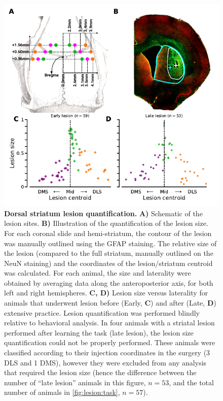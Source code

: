 \begin{figure}[bth!]
	\begin{center}
		\includegraphics[scale=1]{ch-methods/figures/LesionSizeLocation.pdf}
		\caption[Lesion Quantification]
		{\textbf{Dorsal striatum lesion quantification.}
		\textbf{A)} Schematic of the lesion sites.
		\textbf{B)} Illustration of the quantification of the lesion size.
		For each coronal slide and hemi-striatum, the contour of the lesion was manually outlined using the GFAP staining.
		The relative size of the lesion (compared to the full striatum, manually outlined on the NeuN staining) and the coordinates of the lesion/striatum centroid was calculated.
		For each animal, the size and laterality were obtained by averaging data along the anteroposterior axis, for both left and right hemispheres.
		\textbf{C, D)} Lesion size versus laterality for animals that underwent lesion before (Early, \textbf{C}) and after (Late, \textbf{D}) extensive practice.
		Lesion quantification was performed blindly relative to behavioral analysis.
		In four animals with a striatal lesion performed after learning the task (late lesion), the lesion size quantification could not be properly performed.
		These animals were classified according to their injection coordinates in the surgery (3 DLS and 1 DMS), however they were excluded from any analysis that required the lesion size (hence the difference between the number of ``late lesion'' animals in this figure, $n=53$, and the total number of animals in \autoref{fig:lesion:task}, $n=57$).
		}
		\label{fig:method:LesionSizeLocation}
	\end{center}
\end{figure}